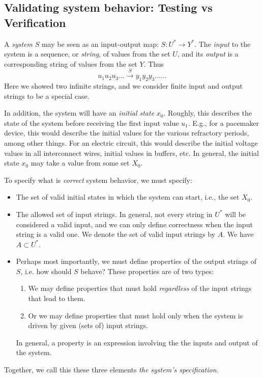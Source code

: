 \subsection{Validating system behavior: Testing vs Verification}

\newcommand{\ub}{\bar{u}}
\newcommand{\yb}{\bar{y}}
A \emph{system} $S$ may be seen as an input-output map: $S: U^* \rightarrow Y^*$.
The \emph{input} to the system is a sequence, or \emph{string}, of values from the set $U$, and its \emph{output} is a corresponding string of values from the set $Y$.
Thus
\[u_1u_2u_3 \ldots \stackrel{S}{\rightarrow} y_1 y_2 y_3 \ldots...\]
Here we showed two infinite strings, and we consider finite input and output strings to be a special case. 

In addition, the system will have an \emph{initial state} $x_0$. 
Roughly, this describes the state of the system before receiving the first input value $u_1$. 
E.g., for a pacemaker device, this would describe the initial values for the various refractory periods, among other things.
For an electric circuit, this would describe the initial voltage values in all interconnect wires, initial values in buffers, etc.
In general, the initial state $x_0$ may take a value from some set $X_0$.

To specify what is \emph{correct} system behavior, we must specify:
\begin{itemize}
	\item The set of valid initial states in which the system can start, i.e., the set $X_0$.
	\item The allowed set of input strings. In general, not every string in $U^*$ will be considered a valid input, and we can only define correctness when the input string is a valid one.
	We denote the set of valid input strings by $A$. 
	We have $A \subset U^*$.
	\item Perhaps most importantly, we must define properties of the output strings of $S$, i.e. how should $S$ behave?
	These properties are of two types:
	\begin{enumerate}
		\item We may define properties that must hold \emph{regardless} of the input strings that lead to them. 
		\item Or we may define properties that must hold only when the system is driven by given (sets of) input strings.
	\end{enumerate}
	In general, a property is an expression involving the the inputs and output of the system.
\end{itemize}
Together, we call this these three elements \emph{the system's specification}.


